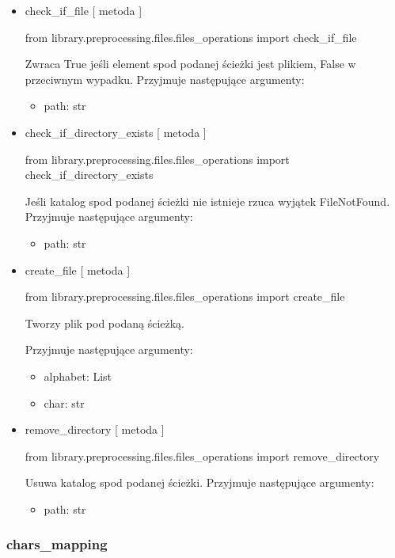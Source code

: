 \begin{itemize}
\item{check\_if\_file [ metoda ] }
\begin{import}
from library.preprocessing.files.files_operations import check_if_file
\end{import}
Zwraca True jeśli element spod podanej ścieżki jest plikiem, False w przeciwnym wypadku.
Przyjmuje następujące argumenty:
\begin{itemize}
	\item path: str
\end{itemize}

\item{check\_if\_directory\_exists [ metoda ] }
\begin{import}
from library.preprocessing.files.files_operations import check_if_directory_exists
\end{import}
Jeśli katalog spod podanej ścieżki nie istnieje rzuca wyjątek FileNotFound.
Przyjmuje następujące argumenty:
\begin{itemize}
	\item path: str
\end{itemize}

\item{create\_file [ metoda ] }
\begin{import}
from library.preprocessing.files.files_operations import create_file
\end{import}
Tworzy plik pod podaną ścieżką. 

Przyjmuje następujące argumenty:
\begin{itemize}
	\item alphabet: List
	\item char: str
\end{itemize}

\item{remove\_directory [ metoda ] }
\begin{import}
from library.preprocessing.files.files_operations import remove_directory
\end{import}

Usuwa katalog spod podanej ścieżki.
Przyjmuje następujące argumenty:
\begin{itemize}
	\item path: str
\end{itemize}

\end{itemize}

\newpage

\subsubsection{chars\_mapping}


